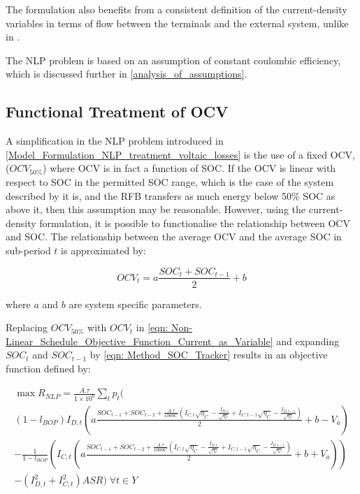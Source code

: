 \documentclass[preprint,3p,review,authoryear,10pt]{elsarticle}
\begin{document}
The formulation also benefits from a consistent definition of the current-density variables in terms of flow between the terminals and the external system, unlike in \cite{Sarker2017}.

The NLP problem is based on an assumption of constant coulombic efficiency, which is discussed further in \cref{analysis_of_assumptions}.

\subsection{Functional Treatment of OCV}
\label{Model_Formulation_Functional_Treatment_OCV}
A simplification in the NLP problem introduced in \cref{Model_Formulation_NLP_treatment_voltaic_losses} is the use of a fixed OCV, ($OCV_{50\%}$) where OCV is in fact a function of SOC. If the OCV is linear with respect to SOC in the permitted SOC range, which is the case of the system described by \cite{Reed2016} it is, and the RFB transfers as much energy below 50\% SOC as above it, then this assumption may be reasonable. However, using the current-density formulation, it is possible to functionalise the relationship between OCV and SOC. The relationship between the average OCV and the average SOC in sub-period $t$ is approximated by:

\begin{equation}
\label{eqn: OCV_vs_SOC}
OCV_t = a\frac{SOC_t + SOC_{t-1}}{2} + b 
\end{equation}

where $a$ and $b$ are system specific parameters.

Replacing $OCV_{50\%}$ with $OCV_t$ in \cref{eqn: Non-Linear_Schedule_Objective_Function_Current_as_Variable} and expanding $SOC_t$ and $SOC_{t-1}$ by \cref{eqn: Method_SOC_Tracker} results in an objective function  defined by:


\begin{equation}
    \label{eqn: NLP_true_OCV_long_form}
    \begin{split}
\max R_{NLP} = \frac{A.\tau}{1\times 10^{6}}\sum_{t}p_{t}(\\
(1-l_{BOP})I_{D, t}(a\frac{SOC_{t-1} + SOC_{t-2} + \frac{A.\tau}{1000C}(I_{C,t}\sqrt{\eta_C} - \frac{I_{D,t}}{\sqrt{\eta_C}} +  I_{C,t-1}\sqrt{\eta_C} - \frac{I_{D,t-1}}{\sqrt{\eta_C}})}{2} + b - V_a)\\ - \frac{1}{1-l_{BOP}}(I_{C, t}(a\frac{SOC_{t-1} +  SOC_{t-2} + \frac{A.\tau}{1000C}(I_{C,t}\sqrt{\eta_C} - \frac{I_{D,t}}{\sqrt{\eta_C}} + I_{C,t-1}\sqrt{\eta_C} - \frac{I_{D,t-1}}{\sqrt{\eta_C}})}{2} + b + V_a))\\ 
- (I_{D,t}^{2} + I_{C,t}^{2})ASR) \; \forall t \in Y
\end{split}
\end{equation}
\end{document}
